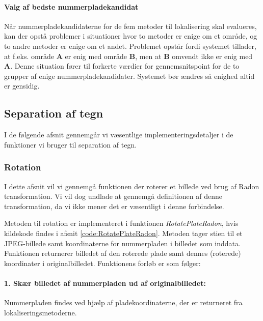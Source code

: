 \paragraph{Valg af bedste nummerpladekandidat}
Når nummerpladekandidaterne for de fem metoder til lokalisering skal evalueres, kan der opstå  problemer i situationer hvor to metoder er enige om et område, og to andre metoder er enige om et andet. Problemet opstår fordi systemet tillader, at f.eks. område \textbf{A} er enig med område \textbf{B}, men at \textbf{B} omvendt ikke er enig med \textbf{A}. Denne situation fører til forkerte værdier for gennemsnitspoint for de to grupper af enige nummerpladekandidater. Systemet bør ændres så 
enighed altid er gensidig.


\subsection{Separation af tegn}

I de følgende afsnit gennemgår vi væsentlige implementeringsdetaljer i de funktioner vi bruger til separation af tegn.

\subsubsection{Rotation}
\label{sec:implementation/sep/rotation}

I dette afsnit vil vi gennemgå funktionen der roterer et billede ved brug af Radon transformation. Vi vil dog undlade at gennemgå definitionen af denne transformation, da vi ikke mener det er væsentligt i denne forbindelse.

Metoden til rotation er implementeret i funktionen \textit{RotatePlateRadon}, hvis kildekode findes i afsnit \vref{code:RotatePlateRadon}. Metoden tager stien til et JPEG-billede samt koordinaterne for nummerpladen i billedet som inddata. Funktionen returnerer billedet af den roterede plade samt dennes (roterede) koordinater i originalbilledet. Funktionens forløb er som følger:

\paragraph{1. Skær billedet af nummerpladen ud af originalbilledet:}
Nummerpladen findes ved hjælp af pladekoordinaterne, der er returneret fra lokaliseringsmetoderne.

